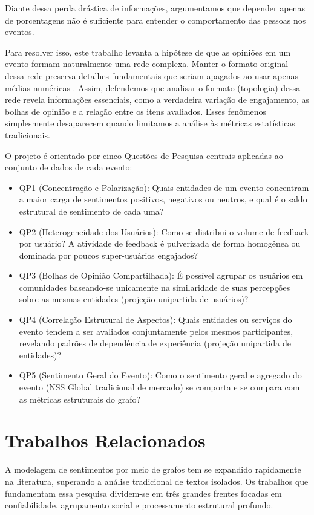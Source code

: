 \documentclass[sigconf]{webmedia}
\begin{document}
Diante dessa perda drástica de informações, argumentamos que depender apenas de porcentagens não é suficiente para entender o comportamento das pessoas nos eventos. 

Para resolver isso, este trabalho levanta a hipótese de que as opiniões em um evento formam naturalmente uma rede complexa. Manter o formato original dessa rede preserva detalhes fundamentais que seriam apagados ao usar apenas médias numéricas \cite{huang2021, gu2024}. Assim, defendemos que analisar o formato (topologia) dessa rede revela informações essenciais, como a verdadeira variação de engajamento, as bolhas de opinião e a relação entre os itens avaliados. Esses fenômenos simplesmente desaparecem quando limitamos a análise às métricas estatísticas tradicionais.

O projeto é orientado por cinco Questões de Pesquisa centrais aplicadas ao conjunto de dados de cada evento:
\begin{itemize}
    \item QP1 (Concentração e Polarização): Quais entidades de um evento concentram a maior carga de sentimentos positivos, negativos ou neutros, e qual é o saldo estrutural de sentimento de cada uma?
    \item QP2 (Heterogeneidade dos Usuários): Como se distribui o volume de feedback por usuário? A atividade de feedback é pulverizada de forma homogênea ou dominada por poucos super-usuários engajados?
    \item QP3 (Bolhas de Opinião Compartilhada): É possível agrupar os usuários em comunidades baseando-se unicamente na similaridade de suas percepções sobre as mesmas entidades (projeção unipartida de usuários)?
    \item QP4 (Correlação Estrutural de Aspectos): Quais entidades ou serviços do evento tendem a ser avaliados conjuntamente pelos mesmos participantes, revelando padrões de dependência de experiência (projeção unipartida de entidades)?
    \item QP5 (Sentimento Geral do Evento): Como o sentimento geral e agregado do evento (NSS Global tradicional de mercado) se comporta e se compara com as métricas estruturais do grafo?
\end{itemize}

\section{Trabalhos Relacionados}

A modelagem de sentimentos por meio de grafos tem se expandido rapidamente na literatura, superando a análise tradicional de textos isolados. Os trabalhos que fundamentam essa pesquisa dividem-se em três grandes frentes focadas em confiabilidade, agrupamento social e processamento estrutural profundo.
\end{document}
